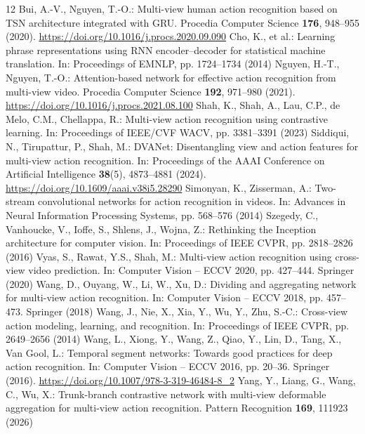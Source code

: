 \documentclass[runningheads]{llncs}
\begin{document}
\begin{thebibliography}{12}
 Bui, A.-V., Nguyen, T.-O.: Multi-view human action recognition based on TSN architecture integrated with GRU. Procedia Computer Science \textbf{176}, 948--955 (2020). \url{https://doi.org/10.1016/j.procs.2020.09.090}
 Cho, K., et al.: Learning phrase representations using RNN encoder--decoder for statistical machine translation. In: Proceedings of EMNLP, pp. 1724--1734 (2014)
 Nguyen, H.-T., Nguyen, T.-O.: Attention-based network for effective action recognition from multi-view video. Procedia Computer Science \textbf{192}, 971--980 (2021). \url{https://doi.org/10.1016/j.procs.2021.08.100}
 Shah, K., Shah, A., Lau, C.P., de Melo, C.M., Chellappa, R.: Multi-view action recognition using contrastive learning. In: Proceedings of IEEE/CVF WACV, pp. 3381--3391 (2023)
 Siddiqui, N., Tirupattur, P., Shah, M.: DVANet: Disentangling view and action features for multi-view action recognition. In: Proceedings of the AAAI Conference on Artificial Intelligence \textbf{38}(5), 4873--4881 (2024). \url{https://doi.org/10.1609/aaai.v38i5.28290}
 Simonyan, K., Zisserman, A.: Two-stream convolutional networks for action recognition in videos. In: Advances in Neural Information Processing Systems, pp. 568--576 (2014)
 Szegedy, C., Vanhoucke, V., Ioffe, S., Shlens, J., Wojna, Z.: Rethinking the Inception architecture for computer vision. In: Proceedings of IEEE CVPR, pp. 2818--2826 (2016)
 Vyas, S., Rawat, Y.S., Shah, M.: Multi-view action recognition using cross-view video prediction. In: Computer Vision -- ECCV 2020, pp. 427--444. Springer (2020)
 Wang, D., Ouyang, W., Li, W., Xu, D.: Dividing and aggregating network for multi-view action recognition. In: Computer Vision -- ECCV 2018, pp. 457--473. Springer (2018)
 Wang, J., Nie, X., Xia, Y., Wu, Y., Zhu, S.-C.: Cross-view action modeling, learning, and recognition. In: Proceedings of IEEE CVPR, pp. 2649--2656 (2014)
 Wang, L., Xiong, Y., Wang, Z., Qiao, Y., Lin, D., Tang, X., Van Gool, L.: Temporal segment networks: Towards good practices for deep action recognition. In: Computer Vision -- ECCV 2016, pp. 20--36. Springer (2016). \url{https://doi.org/10.1007/978-3-319-46484-8_2}
 Yang, Y., Liang, G., Wang, C., Wu, X.: Trunk-branch contrastive network with multi-view deformable aggregation for multi-view action recognition. Pattern Recognition \textbf{169}, 111923 (2026)
\end{thebibliography}
\end{document}
